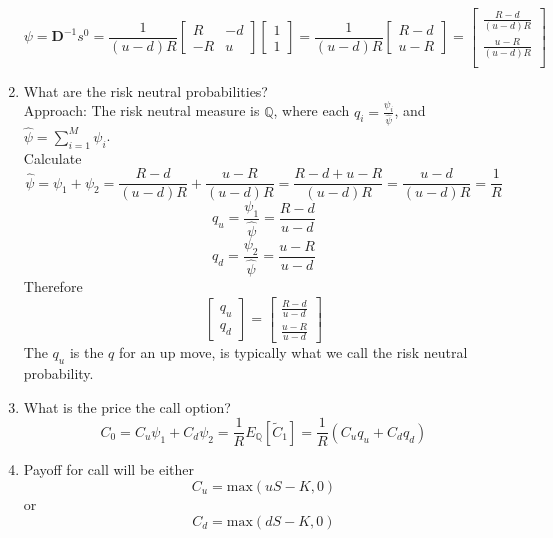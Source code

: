 \documentclass[11pt]{article}
\begin{document}
\begin{enumerate}
        \[
        \psi = \boldsymbol{D}^{-1} s^0 = \frac{1}{(u - d)R} 
        \begin{bmatrix}
            R & - d \\ 
            -R & u
        \end{bmatrix} 
        \begin{bmatrix}
            1 \\ 
            1
        \end{bmatrix} = \frac{1}{(u - d)R} 
        \begin{bmatrix}
            R - d \\ 
            u - R
        \end{bmatrix} = 
        \begin{bmatrix}
            \frac{R-d}{(u-d)R} \\
            \frac{u-R}{(u-d)R} \\
        \end{bmatrix}
        \]
    
        \item What are the risk neutral probabilities? \\
        Approach: The risk neutral measure is $\mathbb{Q}$, where each $q_i = \frac{\psi_i}
        {\hat{\psi}}$, and $\hat{\psi} = \sum_{i=1}^{M} \psi_i$. \\
    
        Calculate 
        \[
        \hat{\psi} = \psi_1 + \psi_2 
        = \frac{R-d}{(u-d)R} + \frac{u-R}{(u-d)R} 
        = \frac{R-d+u-R}{(u-d)R} 
        = \frac{u-d}{(u-d)R} 
        = \frac{1}{R} 
        \]
        \[q_u = \frac{\psi_1}{\hat{\psi}} = \frac{R-d}{u-d}\]
        \[q_d = \frac{\psi_2}{\hat{\psi}} = \frac{u-R}{u-d}\]
        Therefore 
        \[
        \begin{bmatrix}
            q_u \\
            q_d 
        \end{bmatrix} =
        \begin{bmatrix}
            \frac{R-d}{u-d} \\
            \frac{u-R}{u-d}
        \end{bmatrix}    
        \]
        The $q_u$ is the $q$ for an up move, is typically what we call the risk neutral 
        probability.
        
        \item What is the price the call option?
        \[
        C_0 = C_u \psi_1 + C_d \psi_2
        = \frac{1}{R} E_{\mathbb{Q}}[\tilde{C}_1] 
        = \frac{1}{R} (C_u q_u + C_d q_d)
        \]
        
        
    
    \item Payoff for call will be either 
    \[C_u = \text{max}(uS - K, 0)\]
    or 
    \[C_d = \text{max}(dS - K, 0)\]
\end{enumerate}
\end{document}
